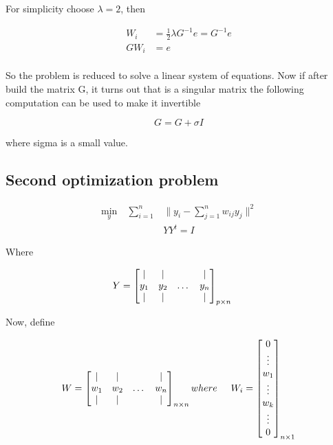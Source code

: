 \documentclass[12pt,journal]{IEEEtran}
\begin{document}
    For simplicity choose $\lambda = 2$, then

    \begin{equation*}
        \begin{aligned}
            W_i &= \frac{1}{2} \lambda G^{-1} e = G^{-1} e \\
            G W_i &= e \\
        \end{aligned}
    \end{equation*}

    So the problem is reduced to solve a linear system of equations. Now if
    after build the matrix G, it turns out that is a singular matrix the
    following computation can be used to make it invertible

    \begin{equation*}
            G = G + \sigma I
    \end{equation*}

    where sigma is a small value.

    \subsection{Second optimization problem}

    \begin{equation*}
        \begin{aligned}
            \underset{y}{\text{min}} \quad \sum_{i=1}^n & \lVert y_i - \sum_{j=1}^n w_{ij} y_j \rVert^2 \\
            & YY^t = I
        \end{aligned}
    \end{equation*}

    Where

    \[
        Y = 
        \begin{bmatrix}
            |   &  |  &       & |   \\
            y_1 & y_2 & \dots & y_n \\
            |   &  |  &       & |
        \end{bmatrix}_{p \times n}
        \hspace{0.5cm}
    \]

    Now, define

    \[
        W = 
        \begin{bmatrix}
            |   &  |  &       & |   \\
            w_1 & w_2 & \dots & w_n \\
            |   &  |  &       & |
        \end{bmatrix}_{n \times n}
        where
        \hspace{0.5cm}
        W_i = 
        \begin{bmatrix}
            0 \\
            \vdots \\ 
            w_1 \\
            \vdots \\ 
            w_k \\
            \vdots \\ 
            0 \\
        \end{bmatrix}_{n \times 1}
    \]
\end{document}

